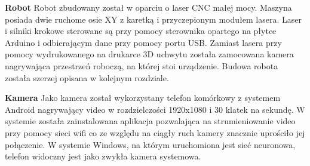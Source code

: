 \textbf{Robot} \newline
Robot zbudowany został w oparciu o laser CNC małej mocy. Maszyna posiada dwie ruchome osie XY z karetką i przyczepionym modułem lasera. Laser i silniki krokowe sterowane są
przy pomocy sterownika opartego na płytce Arduino i odbierającym dane przy pomocy portu USB. Zamiast lasera przy pomocy wydrukowanego na drukarce 3D uchwytu została
zamocowana kamera nagrywająca przestrzeń roboczą, na której stoi urządzenie. Budowa robota została szerzej opisana w kolejnym rozdziale.


\textbf{Kamera} \newline
Jako kamera został wykorzystany telefon komórkowy z systemem Android nagrywający video w rozdzielczości 1920x1080 i 30 klatek na sekundę. W systemie została
zainstalowana aplikacja pozwalająca na strumieniowanie video przy pomocy sieci wifi co ze względu na ciągły ruch kamery znacznie uprościło jej połączenie.
W systemie Windows, na którym uruchomiona jest sieć neuronowa, telefon widoczny jest jako zwykła kamera systemowa.